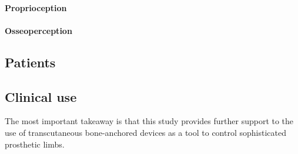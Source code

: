 \paragraph{Proprioception}

\paragraph{Osseoperception}

\subsection{Patients}


\subsection{Clinical use}

The most important takeaway is that this study provides further support to the use of transcutaneous bone-anchored devices as a tool to control sophisticated prosthetic limbs.